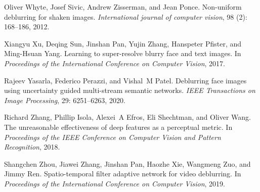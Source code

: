 \documentclass[final]{cvpr}
\begin{document}
{\begin{thebibliography}{43}
Oliver Whyte, Josef Sivic, Andrew Zisserman, and Jean Ponce.
\newblock Non-uniform deblurring for shaken images.
\newblock \emph{International journal of computer vision}, 98
  (2): 168--186, 2012.

Xiangyu Xu, Deqing Sun, Jinshan Pan, Yujin Zhang, Hanspeter Pfister, and
  Ming-Hsuan Yang.
\newblock Learning to super-resolve blurry face and text images.
\newblock In \emph{Proceedings of the International Conference on Computer
  Vision}, 2017.

Rajeev Yasarla, Federico Perazzi, and Vishal~M Patel.
\newblock Deblurring face images using uncertainty guided multi-stream semantic
  networks.
\newblock \emph{IEEE Transactions on Image Processing}, 29:
  6251--6263, 2020.

Richard Zhang, Phillip Isola, Alexei~A Efros, Eli Shechtman, and Oliver Wang.
\newblock The unreasonable effectiveness of deep features as a perceptual
  metric.
\newblock In \emph{Proceedings of the {IEEE} Conference on Computer Vision and
  Pattern Recognition}, 2018.

Shangchen Zhou, Jiawei Zhang, Jinshan Pan, Haozhe Xie, Wangmeng Zuo, and Jimmy
  Ren.
\newblock Spatio-temporal filter adaptive network for video deblurring.
\newblock In \emph{Proceedings of the International Conference on Computer
  Vision}, 2019.

\end{thebibliography}
}
\end{document}
